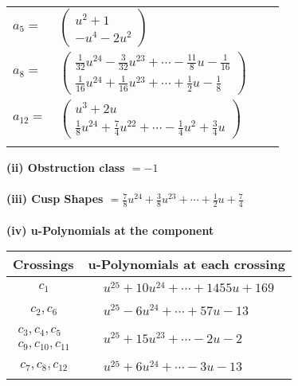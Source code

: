 \documentclass[1p]{elsarticle_modified}
\theoremstyle{definition}
\begin{document}
\begin{tabular}{m{7pt} m{180pt} m{7pt} m{180pt} }
\flushright $a_{5}=$&$\begin{pmatrix}u^2+1\\- u^4-2 u^2\end{pmatrix}$ \\
\flushright $a_{8}=$&$\begin{pmatrix}\frac{1}{32} u^{24}-\frac{3}{32} u^{23}+\cdots-\frac{11}{8} u-\frac{1}{16}\\\frac{1}{16} u^{24}+\frac{1}{16} u^{23}+\cdots+\frac{1}{2} u-\frac{1}{8}\end{pmatrix}$ \\
\flushright $a_{12}=$&$\begin{pmatrix}u^3+2 u\\\frac{1}{8} u^{24}+\frac{7}{4} u^{22}+\cdots-\frac{1}{4} u^2+\frac{3}{4} u\end{pmatrix}$\\&\end{tabular}
\flushleft \textbf{(ii) Obstruction class $= -1$}\\~\\
\flushleft \textbf{(iii) Cusp Shapes $= \frac{7}{8} u^{24}+\frac{3}{8} u^{23}+\cdots+\frac{1}{2} u+\frac{7}{4}$}\\~\\
\newpage\renewcommand{\arraystretch}{1}
\flushleft \textbf{(iv) u-Polynomials at the component}\newline \\
\begin{tabular}{m{50pt}|m{274pt}}
Crossings & \hspace{64pt}u-Polynomials at each crossing \\
\hline $$\begin{aligned}c_{1}\end{aligned}$$&$\begin{aligned}
&u^{25}+10 u^{24}+\cdots+1455 u+169
\end{aligned}$\\
\hline $$\begin{aligned}c_{2},c_{6}\end{aligned}$$&$\begin{aligned}
&u^{25}-6 u^{24}+\cdots+57 u-13
\end{aligned}$\\
\hline $$\begin{aligned}c_{3},c_{4},c_{5}\\c_{9},c_{10},c_{11}\end{aligned}$$&$\begin{aligned}
&u^{25}+15 u^{23}+\cdots-2 u-2
\end{aligned}$\\
\hline $$\begin{aligned}c_{7},c_{8},c_{12}\end{aligned}$$&$\begin{aligned}
&u^{25}+6 u^{24}+\cdots-3 u-13
\end{aligned}$\\
\hline
\end{tabular}\\~\\
\end{document}
